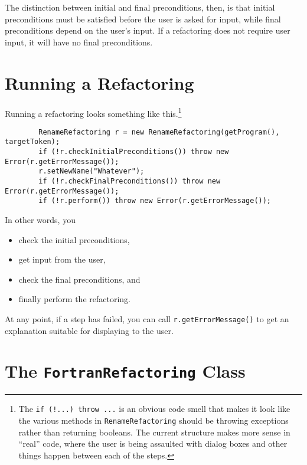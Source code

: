 The distinction between initial and final preconditions, then, is that
initial preconditions must be satisfied before the user is asked for input,
while final preconditions depend on the user's input.  If a refactoring does
not require user input, it will have no final preconditions.

\section{Running a Refactoring}

Running a refactoring looks something like this.\footnote{The
\texttt{if (!...) throw ...} is an obvious code smell that makes it look like
the various methods in \texttt{RenameRefactoring} should be throwing exceptions
rather than returning booleans.  The current structure makes more sense in
``real'' code, where the user is being assaulted with dialog boxes and other
things happen between each of the steps.}

\begin{verbatim}
        RenameRefactoring r = new RenameRefactoring(getProgram(), targetToken);
        if (!r.checkInitialPreconditions()) throw new Error(r.getErrorMessage());
        r.setNewName("Whatever");
        if (!r.checkFinalPreconditions()) throw new Error(r.getErrorMessage());
        if (!r.perform()) throw new Error(r.getErrorMessage());
\end{verbatim}

In other words, you
\begin{itemize}
\item check the initial preconditions,
\item get input from the user,
\item check the final preconditions, and
\item finally perform the refactoring.
\end{itemize}
At any point, if a step has failed, you can call \texttt{r.getErrorMessage()}
to get an explanation suitable for displaying to the user.

\section{The \texttt{FortranRefactoring} Class}

